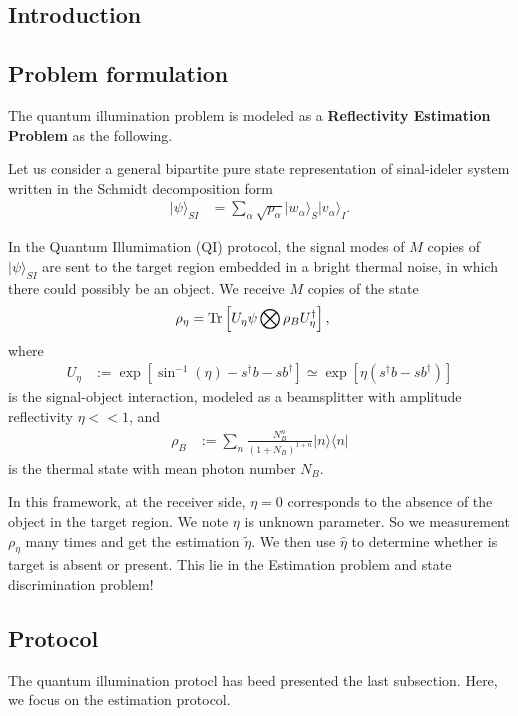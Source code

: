 \documentclass[../../note.tex]{subfiles}
\begin{document}
\subsection{Introduction}


\subsection{Problem formulation}
The quantum illumination problem is modeled as a \textbf{Reflectivity Estimation Problem} as the following.

Let us consider a general bipartite pure state representation of sinal-ideler system written in the Schmidt decomposition form
\begin{align}
    \vert \psi \rangle_{SI}
    &= \sum_{\alpha} \sqrt{p_{\alpha}} \vert w_{\alpha} \rangle_S \vert v_{\alpha} \rangle_I.
\end{align}

In the Quantum Illumimation (QI) protocol, the signal modes of $M$ copies of $\vert \psi \rangle_{SI}$ are sent to the target region embedded in a bright thermal noise, in which there could possibly be an object. We receive $M$ copies of the state
\begin{align}
    \rho_{\eta}
    &= \operatorname{Tr}\left[U_{\eta} \psi \bigotimes \rho_B U_{\eta}^{\dagger}\right],
\end{align}
where 
\begin{align}
    U_{\eta}
    &:= \exp[\sin^{-1}(\eta) - s^\dagger b - s b^\dagger] \simeq \exp[\eta(s^\dagger b - s b^\dagger)]
\end{align}
is the signal-object interaction, modeled as a beamsplitter with amplitude reflectivity $\eta << 1$, and 
\begin{align}
    \rho_B
    &:= \sum_n \frac{N_B^n}{(1+N_B)^{1+n}} \vert n \rangle \langle n \vert
\end{align} 
is the thermal state with mean photon number $N_B$.

In this framework, at the receiver side, $\eta=0$ corresponds to the absence of the object in the target region. We note $\eta$ is unknown parameter. So we measurement $\rho_{\eta}$ many times and get the estimation $\tilde{\eta}$. We then use $\hat{\eta}$ to determine whether is target is absent or present. This lie in the Estimation problem and state discrimination problem!

\subsection{Protocol}
The quantum illumination protocl has beed presented the last subsection. Here, we focus on the estimation protocol.
\end{document}
